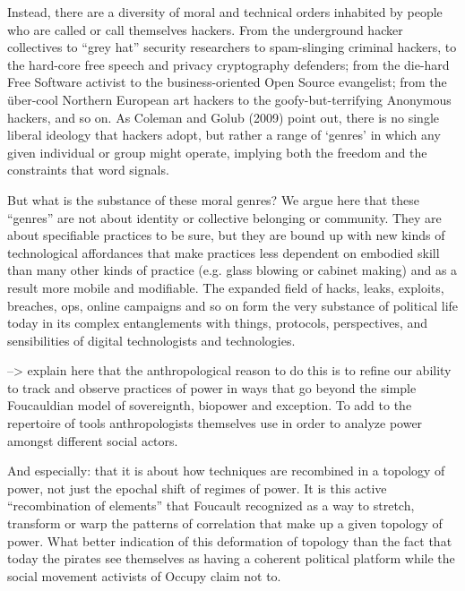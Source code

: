 \documentclass[10pt,letter,oneside]{scrartcl}
\begin{document}
Instead, there are a diversity of moral and technical orders inhabited by people
who are called or call themselves hackers. From the underground hacker collectives 
to ``grey hat'' security researchers to spam-slinging criminal hackers, to the 
hard-core free speech and privacy cryptography defenders; from the die-hard 
Free Software activist to the business-oriented Open Source evangelist; from the 
über-cool Northern European art hackers to the goofy-but-terrifying Anonymous 
hackers, and so on.  As Coleman and Golub (2009) point out, there is no single 
liberal ideology that hackers adopt, but rather a range of ‘genres’ in which any 
given individual or group might operate, implying both the freedom and the
constraints that word signals.

But what is the substance of these moral genres?  We argue here that these 
``genres'' are not about identity or collective belonging or community.  They are 
about specifiable practices to be sure, but they are bound up with new kinds of technological affordances that make practices less dependent on embodied skill than 
many other kinds of practice (e.g. glass blowing or cabinet making) and as a result 
more mobile and modifiable.  The expanded field of hacks, leaks, exploits, breaches, 
ops, online campaigns and so on form the very substance of political life today in 
its complex entanglements with things, protocols, perspectives, and sensibilities of
 digital technologists and technologies.

--> explain here that the anthropological reason to do this is to refine our
ability to track and observe practices of power in ways that go beyond the
simple Foucauldian model of sovereignth, biopower and exception.  To add to the
repertoire of tools anthropologists themselves use in order to analyze power
amongst different social actors.  

{  And especially: that it is about how techniques are recombined in a topology
of power, not just the epochal shift of regimes of power.   It is this active
``recombination of elements'' that Foucault recognized as a way to stretch,
transform or warp the patterns of correlation that make up a given topology of
power. What better indication of this deformation of topology than the fact that
today the pirates see themselves as having a coherent political platform while
the social movement activists of Occupy claim not to.}
\end{document}
